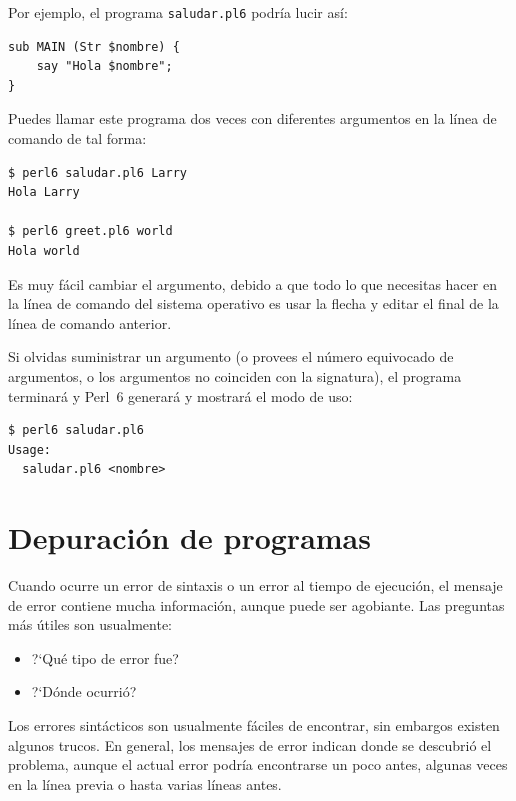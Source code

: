 Por ejemplo, el programa {\tt saludar.pl6} podría lucir
así:
\begin{lstlisting}
sub MAIN (Str $nombre) {
    say "Hola $nombre";
}
\end{lstlisting}

Puedes llamar este programa dos veces con diferentes argumentos
en la línea de comando de tal forma:

\begin{lstlisting}
$ perl6 saludar.pl6 Larry
Hola Larry

$ perl6 greet.pl6 world
Hola world
\end{lstlisting}

Es muy fácil cambiar el argumento, debido a que todo lo que
necesitas hacer en la línea de comando del sistema operativo
es usar la flecha y editar el final de la línea de comando
anterior.

Si olvidas suministrar un argumento (o provees el número 
equivocado de argumentos, o los argumentos no coinciden con
la signatura), el programa terminará y Perl~6 generará
y mostrará el modo de uso:

\begin{lstlisting}
$ perl6 saludar.pl6
Usage:
  saludar.pl6 <nombre>
\end{lstlisting}


\section{Depuración de programas}
\label{whitespace}

Cuando ocurre un error de sintaxis o un error al tiempo de ejecución,
el mensaje de error contiene mucha información, aunque puede ser
agobiante. Las preguntas más útiles son usualmente:

\begin{itemize}

\item ?`Qué tipo de error fue?

\item ?`Dónde ocurrió?

\end{itemize}

Los errores sintácticos son usualmente fáciles de encontrar,
sin embargos existen algunos trucos. En general, los mensajes 
de error indican donde se descubrió el problema, aunque el actual
error podría encontrarse un poco antes, algunas veces en la 
línea previa o hasta varias líneas antes.

